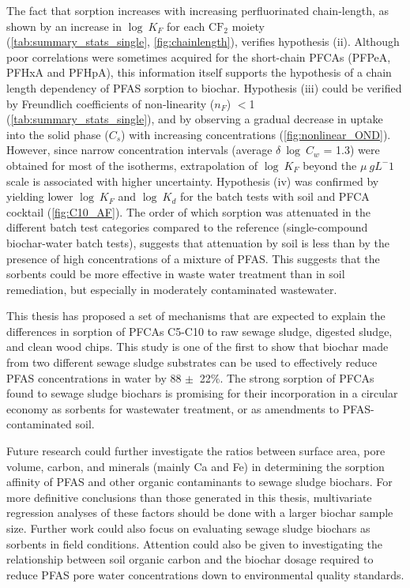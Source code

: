 The fact that sorption increases with increasing perfluorinated chain-length, as shown by an increase in $\log~K_F$ for each $\mathrm{CF_2}$ moiety (\cref{tab:summary_stats_single}, \cref{fig:chainlength}), verifies hypothesis (ii). Although poor correlations were sometimes acquired for the short-chain PFCAs (PFPeA, PFHxA and PFHpA), this information itself supports the hypothesis of a chain length dependency of PFAS sorption to biochar. Hypothesis (iii) could be verified by Freundlich coefficients of non-linearity ($n_F$) $<$1 (\cref{tab:summary_stats_single}), and by observing a gradual decrease in uptake into the solid phase ($C_s$) with increasing concentrations (\cref{fig:nonlinear_OND}). However, since narrow concentration intervals (average $\delta~\log~C_w$ = 1.3) were obtained for most of the isotherms, extrapolation of $\log~K_F$ beyond the $\mu~g L^-1$ scale is associated with higher uncertainty. Hypothesis (iv) was confirmed by yielding lower $\log~K_F$ and $\log~K_d$ for the batch tests with soil and PFCA cocktail (\cref{fig:C10_AF}). The order of which sorption was attenuated in the different batch test categories compared to the reference (single-compound biochar-water batch tests), suggests that attenuation by soil is less than by the presence of high concentrations of a mixture of PFAS. This suggests that the sorbents could be more effective in waste water treatment than in soil remediation, but especially in moderately contaminated wastewater. 

This thesis has proposed a set of mechanisms that are expected to explain the differences in sorption of PFCAs C5-C10 to raw sewage sludge, digested sludge, and clean wood chips. This study is one of the first to show that biochar made from two different sewage sludge substrates can be used to effectively reduce PFAS concentrations in water by 88 $\pm~$ 22\%. The strong sorption of PFCAs found to sewage sludge biochars is promising for their incorporation in a circular economy as sorbents for wastewater treatment, or as amendments to PFAS-contaminated soil. 

Future research could further investigate the ratios between surface area, pore volume, carbon, and minerals (mainly Ca and Fe) in determining the sorption affinity of PFAS and other organic contaminants to sewage sludge biochars. For more definitive conclusions than those generated in this thesis, multivariate regression analyses of these factors should be done with a larger biochar sample size. Further work could also focus on evaluating sewage sludge biochars as sorbents in field conditions. Attention could also be given to investigating the relationship between soil organic carbon and the biochar dosage required to reduce PFAS pore water concentrations down to environmental quality standards. 

